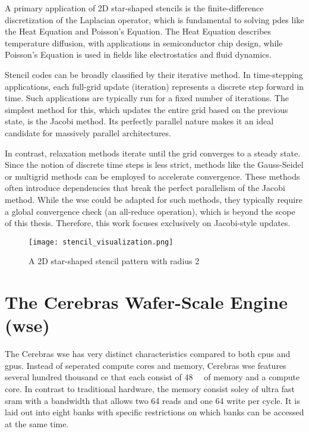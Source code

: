 A primary application of 2D star-shaped stencils is the finite-difference discretization of the Laplacian operator, which is fundamental to solving \acp{pde} like the Heat Equation and Poisson's Equation. The Heat Equation describes temperature diffusion, with applications in semiconductor chip design, while Poisson's Equation is used in fields like electrostatics and fluid dynamics.

Stencil codes can be broadly classified by their iterative method. In time-stepping applications, each full-grid update (iteration) represents a discrete step forward in time. Such applications are typically run for a fixed number of iterations. The simplest method for this, which updates the entire grid based on the previous state, is the Jacobi method. Its perfectly parallel nature makes it an ideal candidate for massively parallel architectures.

In contrast, relaxation methods iterate until the grid converges to a steady state. Since the notion of discrete time steps is less strict, methods like the Gauss-Seidel or multigrid methods can be employed to accelerate convergence. These methods often introduce dependencies that break the perfect parallelism of the Jacobi method. While the \ac{wse} could be adapted for such methods, they typically require a global convergence check (an all-reduce operation), which is beyond the scope of this thesis. Therefore, this work focuses exclusively on Jacobi-style updates.

\begin{figure}[h]
    \centering
    \texttt{[image: stencil\_visualization.png]}
    \caption{A 2D star-shaped stencil pattern with radius 2}
    \label{fig:stencil_visualization}
\end{figure}

\section{The Cerebras Wafer-Scale Engine (\ac{wse})}
The Cerebras \ac{wse} has very distinct characteristics compared to both \acp{cpu} and \acp{gpu}.
Instead of seperated compute cores and memory, Cerebras \ac{wse} features several hundred thousand \ac{ce} that each consist of \qty{48}{\kilo\byte} of memory and a compute core. In contrast to traditional hardware, the memory consist soley of ultra fast \ac{sram} with a bandwidth that allows two \qty{64}{\bit} reads and one \qty{64}{\bit} write per cycle. It is laid out into eight banks with specific restrictions on which banks can be accessed at the same time.


